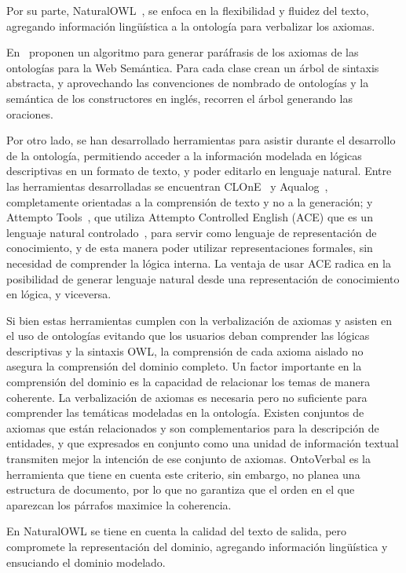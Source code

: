 Por su parte, NaturalOWL~\cite{galanis2007generating}, se enfoca en la flexibilidad y fluidez del texto, agregando información lingüística a la ontología para verbalizar los axiomas.

En~\cite{hewlett2005effective} proponen un algoritmo para generar paráfrasis de los axiomas de las ontologías para la Web Semántica. Para cada clase crean un árbol de sintaxis abstracta, y aprovechando las convenciones de nombrado de ontologías y la semántica de los constructores en inglés, recorren el árbol generando las oraciones.

Por otro lado, se han desarrollado herramientas para asistir durante el desarrollo de la ontología, permitiendo acceder a la información modelada en lógicas descriptivas en un formato de texto, y poder editarlo en lenguaje natural. Entre las herramientas desarrolladas se encuentran CLOnE~\cite{power2010complexity} y Aqualog~\cite{lopez2005aqualog}, completamente orientadas a la comprensión de texto y no a la generación; y Attempto Tools~\cite{attempto}, que utiliza Attempto Controlled English  (ACE) que es un lenguaje natural controlado~\cite{CNL}, para servir como lenguaje de representación de conocimiento, y de esta manera poder utilizar representaciones formales, sin necesidad de comprender la lógica interna. La ventaja de usar ACE radica en la posibilidad de generar lenguaje natural desde una representación de conocimiento en lógica, y viceversa.

Si bien estas herramientas cumplen con la verbalización de axiomas y asisten en el uso de ontologías evitando que los usuarios deban comprender las lógicas descriptivas y la sintaxis OWL, la comprensión de cada axioma aislado no asegura la comprensión del dominio completo. Un factor importante en la comprensión del dominio es la capacidad de relacionar los temas de manera coherente. La verbalización de axiomas es necesaria pero no suficiente para comprender las temáticas modeladas en la ontología. Existen conjuntos de axiomas que están relacionados y son complementarios para la descripción de entidades, y que expresados en conjunto como una unidad de información textual transmiten mejor la intención de ese conjunto de axiomas. OntoVerbal es la herramienta que tiene en cuenta este criterio, sin embargo, no planea una estructura de documento, por lo que no garantiza que el orden en el que aparezcan los párrafos maximice la coherencia.

En NaturalOWL se tiene en cuenta la calidad del texto de salida, pero compromete la representación del dominio, agregando información lingüística y ensuciando el dominio modelado. 

